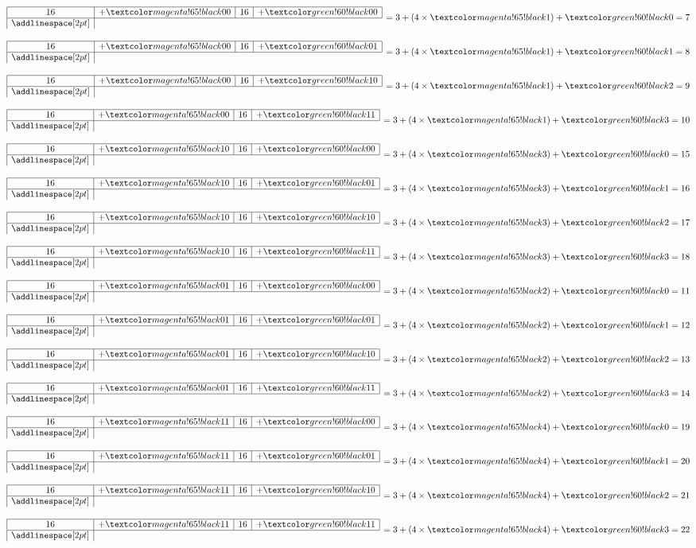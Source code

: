 \begin{minipage}[t]{0.5\textwidth}
	\vspace{0pt}
	\newcommand{\codearray}[4]{
		$\begin{array}{|c|c|c|c|}
			\hline
			16 & +\colorB{#1} & 16 & +\colorA{#2} \\
			\hline
			\addlinespace[2pt]
		\end{array} \,= #3 = #4$
		
	}
	
	\codearray{00}{00}{3 + (4 \times \colorB{1}) + \colorA{0}}{7}
	\codearray{00}{01}{3 + (4 \times \colorB{1}) + \colorA{1}}{8}
	\codearray{00}{10}{3 + (4 \times \colorB{1}) + \colorA{2}}{9}
	\codearray{00}{11}{3 + (4 \times \colorB{1}) + \colorA{3}}{10}
	
	\vspace{16pt}
	
	\codearray{10}{00}{3 + (4 \times \colorB{3}) + \colorA{0}}{15}
	\codearray{10}{01}{3 + (4 \times \colorB{3}) + \colorA{1}}{16}
	\codearray{10}{10}{3 + (4 \times \colorB{3}) + \colorA{2}}{17}
	\codearray{10}{11}{3 + (4 \times \colorB{3}) + \colorA{3}}{18}
\end{minipage}%
\begin{minipage}[t]{0.5\textwidth}
	\vspace{0pt}
	\newcommand{\codearray}[4]{
		$\begin{array}{|c|c|c|c|}
			\hline
			16 & +\colorB{#1} & 16 & +\colorA{#2} \\
			\hline
			\addlinespace[2pt]
		\end{array} \,= #3 = #4$
		
	}
	
	\codearray{01}{00}{3 + (4 \times \colorB{2}) + \colorA{0}}{11}
	\codearray{01}{01}{3 + (4 \times \colorB{2}) + \colorA{1}}{12}
	\codearray{01}{10}{3 + (4 \times \colorB{2}) + \colorA{2}}{13}
	\codearray{01}{11}{3 + (4 \times \colorB{2}) + \colorA{3}}{14}
	
	\vspace{16pt}
	
	\codearray{11}{00}{3 + (4 \times \colorB{4}) + \colorA{0}}{19}
	\codearray{11}{01}{3 + (4 \times \colorB{4}) + \colorA{1}}{20}
	\codearray{11}{10}{3 + (4 \times \colorB{4}) + \colorA{2}}{21}
	\codearray{11}{11}{3 + (4 \times \colorB{4}) + \colorA{3}}{22}
\end{minipage}

\vspace{16pt}

